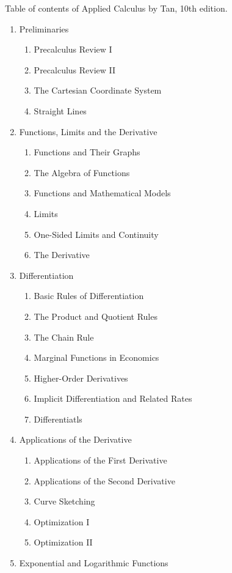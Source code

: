 \documentclass{amsart}
\begin{document}
Table of contents of Applied Calculus by Tan, 10th edition.

\begin{enumerate}
\item Preliminaries
    \begin{enumerate}
    \item Precalculus Review I
    \item Precalculus Review II
    \item The Cartesian Coordinate System
    \item Straight Lines
    \end{enumerate}
\item Functions, Limits and the Derivative
    \begin{enumerate}
    \item Functions and Their Graphs
    \item The Algebra of Functions
    \item Functions and Mathematical Models
    \item Limits
    \item One-Sided Limits and Continuity
    \item The Derivative
    \end{enumerate}
\item Differentiation
	\begin{enumerate}
	\item Basic Rules of Differentiation
	\item The Product and Quotient Rules
	\item The Chain Rule
	\item Marginal Functions in Economics
	\item Higher-Order Derivatives
	\item Implicit Differentiation and Related Rates
	\item Differentiatls
	\end{enumerate}
\item Applications of the Derivative
	\begin{enumerate}
	\item Applications of the First Derivative
	\item Applications of the Second Derivative
	\item Curve Sketching
	\item Optimization I
	\item Optimization II
	\end{enumerate}
\item Exponential and Logarithmic Functions

\end{enumerate}
\end{document}
